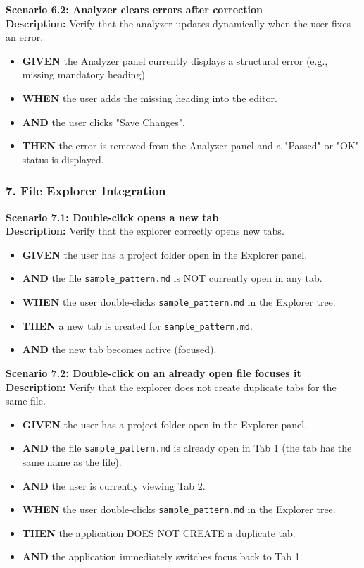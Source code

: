 \documentclass[12pt, a4paper]{article}
\begin{document}
\textbf{Scenario 6.2: Analyzer clears errors after correction} \\
\textbf{Description:} Verify that the analyzer updates dynamically when the user fixes an error.
\begin{itemize}
    \item \textbf{GIVEN} the Analyzer panel currently displays a structural error (e.g., missing mandatory heading).
    \item \textbf{WHEN} the user adds the missing heading into the editor.
    \item \textbf{AND} the user clicks "Save Changes".
    \item \textbf{THEN} the error is removed from the Analyzer panel and a "Passed" or "OK" status is displayed.
\end{itemize}

\subsubsection*{7. File Explorer Integration}

\textbf{Scenario 7.1: Double-click opens a new tab} \\
\textbf{Description:} Verify that the explorer correctly opens new tabs.
\begin{itemize}
    \item \textbf{GIVEN} the user has a project folder open in the Explorer panel.
    \item \textbf{AND} the file \texttt{sample\_pattern.md} is NOT currently open in any tab.
    \item \textbf{WHEN} the user double-clicks \texttt{sample\_pattern.md} in the Explorer tree.
    \item \textbf{THEN} a new tab is created for \texttt{sample\_pattern.md}.
    \item \textbf{AND} the new tab becomes active (focused).
\end{itemize}

\textbf{Scenario 7.2: Double-click on an already open file focuses it} \\
\textbf{Description:} Verify that the explorer does not create duplicate tabs for the same file.
\begin{itemize}
    \item \textbf{GIVEN} the user has a project folder open in the Explorer panel.
    \item \textbf{AND} the file \texttt{sample\_pattern.md} is already open in Tab 1 (the tab has the same name as the file).
    \item \textbf{AND} the user is currently viewing Tab 2.
    \item \textbf{WHEN} the user double-clicks \texttt{sample\_pattern.md} in the Explorer tree.
    \item \textbf{THEN} the application DOES NOT CREATE a duplicate tab.
    \item \textbf{AND} the application immediately switches focus back to Tab 1.
\end{itemize}
\end{document}
